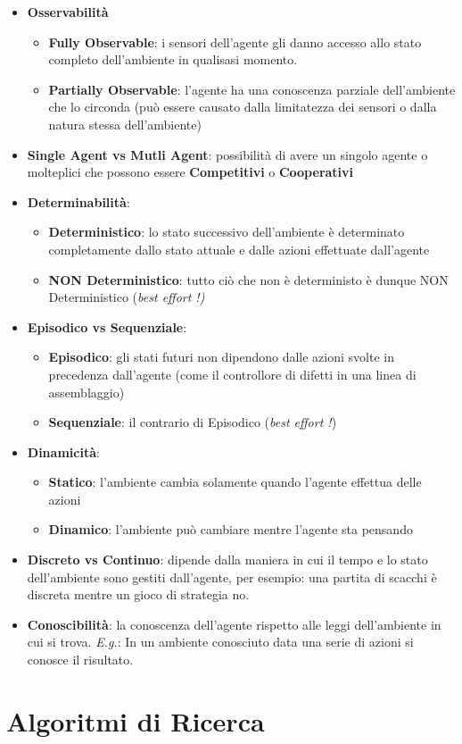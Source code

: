 \documentclass{article}
\begin{document}
            \begin{itemize}
                \item \textbf{Osservabilità}
                \begin{itemize}
                    \item \textbf{Fully Observable}: i sensori dell'agente gli danno accesso allo stato completo dell'ambiente in qualisasi momento.
                    \item \textbf{Partially Observable}: l'agente ha una conoscenza parziale dell'ambiente che lo circonda (può essere causato dalla limitatezza dei sensori o dalla natura stessa dell'ambiente)
                \end{itemize}
                \item \textbf{Single Agent vs Mutli Agent}: possibilità di avere un singolo agente o molteplici che possono essere \textbf{Competitivi} o \textbf{Cooperativi}
                \item \textbf{Determinabilità}:
                \begin{itemize}
                    \item \textbf{Deterministico}: lo stato successivo dell'ambiente è determinato completamente dallo stato attuale e dalle azioni effettuate dall'agente
                    \item \textbf{NON Deterministico}: tutto ciò che non è deterministo è dunque NON Deterministico (\emph{best effort !)}
                \end{itemize}
                \item \textbf{Episodico vs Sequenziale}:
                \begin{itemize}
                    \item \textbf{Episodico}: gli stati futuri non dipendono dalle azioni svolte in precedenza dall'agente (come il controllore di difetti in una linea di assemblaggio)
                    \item \textbf{Sequenziale}: il contrario di Episodico (\emph{best effort !})
                \end{itemize}
                \item \textbf{Dinamicità}:
                \begin{itemize}
                    \item \textbf{Statico}: l'ambiente cambia solamente quando l'agente effettua delle azioni
                    \item \textbf{Dinamico}: l'ambiente può cambiare mentre l'agente sta pensando
                \end{itemize}
                \item \textbf{Discreto vs Continuo}: dipende dalla maniera in cui il tempo e lo stato dell'ambiente sono gestiti dall'agente, per esempio: una partita di scacchi è discreta mentre un gioco di strategia no.
                \item \textbf{Conoscibilità}:  la conoscenza dell'agente rispetto alle leggi dell'ambiente in cui si trova.
                \textit{E.g.}: In un ambiente conosciuto data una serie di azioni si conosce il risultato.       
            \end{itemize}
    
    \section{Algoritmi di Ricerca}
\end{document}
